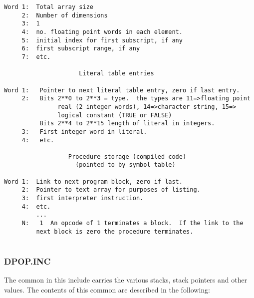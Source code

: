 \begin{verbatim}
Word 1:  Total array size
     2:  Number of dimensions
     3:  1
     4:  no. floating point words in each element.
     5:  initial index for first subscript, if any
     6:  first subscript range, if any
     7:  etc.

                     Literal table entries

Word 1:   Pointer to next literal table entry, zero if last entry.
     2:   Bits 2**0 to 2**3 = type.  the types are 11=>floating point
               real (2 integer words), 14=>character string, 15=>
               logical constant (TRUE or FALSE)
          Bits 2**4 to 2**15 length of literal in integers.
     3:   First integer word in literal.
     4:   etc.

                  Procedure storage (compiled code)
                    (pointed to by symbol table)

Word 1:  Link to next program block, zero if last.
     2:  Pointer to text array for purposes of listing.
     3:  first interpreter instruction.
     4:  etc.
         ...
     N:   1  An opcode of 1 terminates a block.  If the link to the
         next block is zero the procedure terminates.


\end{verbatim}
\subsubsection{DPOP.INC}
The common in this include carries the various stacks, stack pointers
and other values.  The contents of this common are described in the
following:

